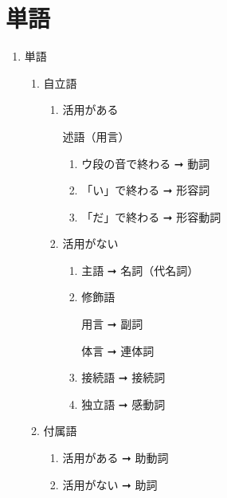 \chapter{単語}
\newpage

\begin{enumerate}
    \item 単語
          \begin{enumerate}
              \item 自立語
                    \begin{enumerate}
                        \item 活用がある\par
                              述語（用言）
                              \begin{enumerate}
                                  \item ウ段の音で終わる ➞ 動詞
                                  \item 「い」で終わる ➞ 形容詞
                                  \item 「だ」で終わる ➞ 形容動詞
                              \end{enumerate}
                        \item 活用がない
                              \begin{enumerate}
                                  \item 主語 ➞ 名詞（代名詞）
                                  \item 修飾語\par
                                        用言 ➞ 副詞\par
                                        体言 ➞ 連体詞\par
                                  \item 接続語 ➞ 接続詞
                                  \item 独立語 ➞ 感動詞
                              \end{enumerate}
                    \end{enumerate}
              \item 付属語
                    \begin{enumerate}
                        \item 活用がある ➞ 助動詞
                        \item 活用がない ➞ 助詞
                    \end{enumerate}
          \end{enumerate}
\end{enumerate}

